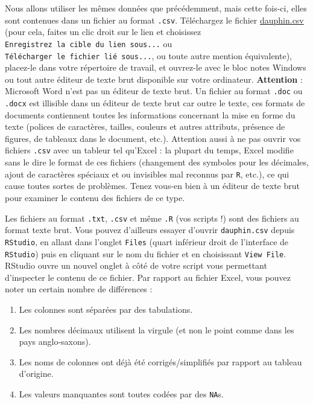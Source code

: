 \documentclass[
  a4paper,
  DIV=11,
  numbers=noendperiod,
  oneside]{scrreprt}
\providecommand{\tightlist}{%
  \setlength{\itemsep}{0pt}\setlength{\parskip}{0pt}}\usepackage{longtable,booktabs,array}
\begin{document}
Nous allons utiliser les mêmes données que précédemment, mais cette
fois-ci, elles sont contenues dans un fichier au format \texttt{.csv}.
Téléchargez le fichier \href{data/dauphin.csv}{dauphin.csv} (pour cela,
faites un clic droit sur le lien et choisissez
\texttt{Enregistrez\ la\ cible\ du\ lien\ sous...} ou
\texttt{Télécharger\ le\ fichier\ lié\ sous...}, ou toute autre mention
équivalente), placez-le dans votre répertoire de travail, et ouvrez-le
avec le bloc notes Windows ou tout autre éditeur de texte brut
disponible sur votre ordinateur. \textbf{Attention} : Microsoft Word
n'est pas un éditeur de texte brut. Un fichier au format \texttt{.doc}
ou \texttt{.docx} est illisible dans un éditeur de texte brut car outre
le texte, ces formats de documents contiennent toutes les informations
concernant la mise en forme du texte (polices de caractères, tailles,
couleurs et autres attributs, présence de figures, de tableaux dans le
document, etc.). Attention aussi à ne pas ouvrir vos fichiers
\texttt{.csv} avec un tableur tel qu'Excel : la plupart du temps, Excel
modifie sans le dire le format de ces fichiers (changement des symboles
pour les décimales, ajout de caractères spéciaux et ou invisibles mal
reconnus par \texttt{R}, etc.), ce qui cause toutes sortes de problèmes.
Tenez vous-en bien à un éditeur de texte brut pour examiner le contenu
des fichiers de ce type.

Les fichiers au format \texttt{.txt}, \texttt{.csv} et même \texttt{.R}
(vos scripts !) sont des fichiers au format texte brut. Vous pouvez
d'ailleurs essayer d'ouvrir \texttt{dauphin.csv} depuis
\texttt{RStudio}, en allant dans l'onglet \texttt{Files} (quart
inférieur droit de l'interface de \texttt{RStudio}) puis en cliquant sur
le nom du fichier et en choisissant \texttt{View\ File}. RStudio ouvre
un nouvel onglet à côté de votre script vous permettant d'inspecter le
contenu de ce fichier. Par rapport au fichier Excel, vous pouvez noter
un certain nombre de différences :

\begin{enumerate}
\def\labelenumi{\arabic{enumi}.}
\tightlist
\item
  Les colonnes sont séparées par des tabulations.
\item
  Les nombres décimaux utilisent la virgule (et non le point comme dans
  les pays anglo-saxons).
\item
  Les noms de colonnes ont déjà été corrigés/simplifiés par rapport au
  tableau d'origine.
\item
  Les valeurs manquantes sont toutes codées par des \texttt{NA}s.
\end{enumerate}
\end{document}
